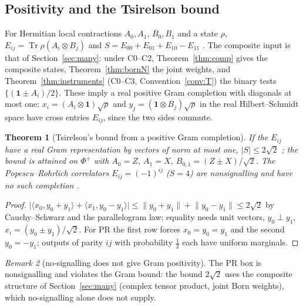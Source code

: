 \documentclass[aps,pra,onecolumn,superscriptaddress,nofootinbib,10pt]{revtex4-2}
\newtheorem{theorem}{Theorem}
\theoremstyle{definition}
\theoremstyle{remark}
\newtheorem{remark}[theorem]{Remark}
\newcommand{\tr}{\operatorname{Tr}}
\newcommand{\ip}[2]{\langle #1,#2\rangle}
\begin{document}
\subsection{Positivity and the Tsirelson bound}\label{sec:bdbell}
For Hermitian local contractions $A_0,A_1$, $B_0,B_1$ and a state $\rho$, $E_{ij}=\tr\rho(A_i\otimes B_j)$ and $S=E_{00}+E_{01}+E_{10}-E_{11}$ \cite{n2-chsh}.  The
composite input is that of Section~\ref{sec:many}: under C0--C2, Theorem~\ref{thm:comp} gives the composite states,
Theorem~\ref{thm:bornN} the joint weights, and Theorem~\ref{thm:instruments} (C0--C3, Convention~\ref{conv:T}) the
binary tests $\{(\mathbf1\pm A_i)/2\}$.  These imply a real positive Gram completion with diagonals at most one: $x_i=(A_i\otimes\mathbf1)\sqrt\rho$ and
$y_j=(\mathbf1\otimes B_j)\sqrt\rho$ in the real Hilbert--Schmidt space have cross entries $E_{ij}$, since the two sides commute.

\begin{theorem}[Tsirelson's bound from a positive Gram completion]\label{thm:bdchsh}
If the $E_{ij}$ have a real Gram representation by vectors of norm at most one, $\lvert S\rvert\le2\sqrt2$ \cite{n4:Tsirelson}; the bound
is attained on $\Phi^+$ with $A_0=Z$, $A_1=X$, $B_{0,1}=(Z\pm X)/\sqrt2$.  The Popescu--Rohrlich correlators $E_{ij}=(-1)^{ij}$ ($S=4$) are
nonsignalling and have no such completion \cite{n4:PR}.
\end{theorem}
\begin{proof}
$\lvert\ip{x_0}{y_0+y_1}+\ip{x_1}{y_0-y_1}\rvert\le\lVert y_0+y_1\rVert+\lVert y_0-y_1\rVert\le2\sqrt2$ by Cauchy--Schwarz and the parallelogram law; equality needs unit vectors, $y_0\perp y_1$,
$x_i=(y_0\pm y_1)/\sqrt2$.  For PR the first row forces $x_0=y_0=y_1$ and the second $y_0=-y_1$; outputs of parity $ij$ with probability
$\tfrac12$ each have uniform marginals.
\end{proof}
\begin{remark}[no-signalling does not give Gram positivity]\label{rem:bdpr}
The PR box is nonsignalling and violates the Gram bound: the bound $2\sqrt2$ uses the composite structure
of Section~\ref{sec:many} (complex tensor product, joint Born weights), which no-signalling alone does not
supply.
\end{remark}
\end{document}
